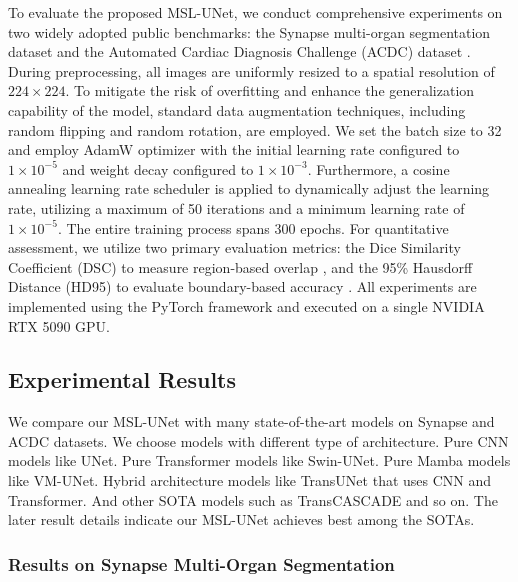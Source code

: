 \documentclass[10pt, a4paper, twocolumn]{article}
\begin{document}
To evaluate the proposed MSL-UNet, we conduct comprehensive experiments on two widely adopted public benchmarks: the Synapse multi-organ segmentation dataset \cite{landman2015miccai} and the Automated Cardiac Diagnosis Challenge (ACDC) dataset \cite{bernard2018deep}. During preprocessing, all images are uniformly resized to a spatial resolution of $224 \times 224$. To mitigate the risk of overfitting and enhance the generalization capability of the model, standard data augmentation techniques, including random flipping and random rotation, are employed. We set the batch size to 32 and employ AdamW optimizer \cite{loshchilov2017decoupled} with the initial learning rate configured to $1 \times 10^{-5}$ and weight decay configured to $1 \times 10^{-3}$. Furthermore, a cosine annealing learning rate scheduler \cite{loshchilov2016sgdr} is applied to dynamically adjust the learning rate, utilizing a maximum of 50 iterations and a minimum learning rate of $1 \times 10^{-5}$. The entire training process spans 300 epochs. For quantitative assessment, we utilize two primary evaluation metrics: the Dice Similarity Coefficient (DSC) to measure region-based overlap \cite{milletari2016v}, and the 95\% Hausdorff Distance (HD95) to evaluate boundary-based accuracy \cite{huttenlocher1993comparing}. All experiments are implemented using the PyTorch framework and executed on a single NVIDIA RTX 5090 GPU.










\subsection{Experimental Results}

We compare our MSL-UNet with many state-of-the-art models on Synapse and ACDC datasets. We choose models with different type of architecture. Pure CNN models like UNet\cite{ronneberger2015unet}. Pure Transformer models like Swin-UNet\cite{cao2021swinunet,cao2023swin}. Pure Mamba models like VM-UNet\cite{ruan2024vmunet}. Hybrid architecture models like TransUNet\cite{chen2021transunet} that uses CNN and Transformer. And other SOTA models such as TransCASCADE\cite{rahman2023transcascade} and so on. The later result details indicate our MSL-UNet achieves best among the SOTAs.



\subsubsection{Results on Synapse Multi-Organ Segmentation}
\end{document}
